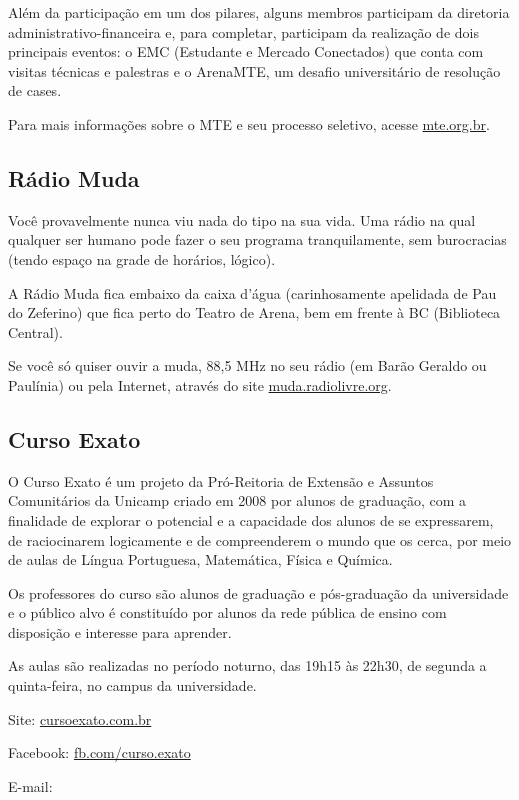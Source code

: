 Além da participação em um dos pilares, alguns membros participam da diretoria administrativo-financeira e, para completar, participam da realização de dois principais eventos: o EMC (Estudante e Mercado Conectados) que conta com visitas técnicas e palestras e o ArenaMTE, um desafio universitário de resolução de cases.

Para mais informações sobre o MTE e seu processo seletivo, acesse
\url{mte.org.br}.

\subsection{Rádio Muda}

Você provavelmente nunca viu nada do tipo na sua vida. Uma rádio na qual
qualquer ser humano pode fazer o seu programa tranquilamente, sem burocracias
(tendo espaço na grade de horários, lógico).

A Rádio Muda fica embaixo da caixa d'água (carinhosamente apelidada de Pau do
Zeferino) que fica perto do Teatro de Arena, bem em frente à BC (Biblioteca
Central).

Se você só quiser ouvir a muda, 88,5 MHz no seu rádio (em Barão Geraldo ou
Paulínia) ou pela Internet, através do site \url{muda.radiolivre.org}.

\subsection{Curso Exato}

O Curso Exato é um projeto da Pró-Reitoria de Extensão e Assuntos Comunitários
da Unicamp criado em 2008 por alunos de graduação, com a finalidade de explorar
o potencial e a capacidade dos alunos de se expressarem, de raciocinarem
logicamente e de compreenderem o mundo que os cerca, por meio de aulas de Língua
Portuguesa, Matemática, Física e Química.

Os professores do curso são alunos de graduação e pós-graduação da universidade
e o público alvo é constituído por alunos da rede pública de ensino com
disposição e interesse para aprender.

As aulas são realizadas no período noturno, das 19h15 às 22h30, de segunda
a quinta-feira, no campus da universidade.

\begin{compactitemize}
\item Site: \url{cursoexato.com.br}
\item Facebook: \url{fb.com/curso.exato}
\item E-mail: 
\end{compactitemize}

